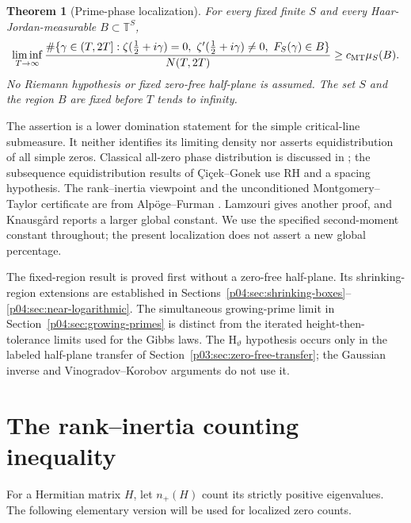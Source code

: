 \documentclass[11pt,letterpaper]{article}
\newtheorem{theorem}{Theorem}[section]
\theoremstyle{definition}
\theoremstyle{remark}
\newcommand{\T}{\mathbb T}
\newcommand{\1}{\mathbf 1}
\begin{document}
\begin{theorem}[Prime-phase localization]\label{p03:thm:main-phase}
For every fixed finite $S$ and every Haar-Jordan-measurable
$B\subset\T^S$,
\[
 \liminf_{T\to\infty}
 \frac{\#\{\gamma\in(T,2T]:\zeta(\tfrac12+i\gamma)=0,
 \ \zeta'(\tfrac12+i\gamma)\ne0,\ F_S(\gamma)\in B\}}
 {N(T,2T)}\ge c_{\rm MT}\mu_S(B).
\]
No Riemann hypothesis or fixed zero-free half-plane is assumed.
The set $S$ and the region $B$ are fixed before $T$ tends to infinity.
\end{theorem}

The assertion is a lower domination statement for the simple
critical-line submeasure. It neither identifies its limiting density
nor asserts equidistribution of all simple zeros. Classical
all-zero phase distribution is discussed in
\cite{AkbaryMurty,FordZaharescu,FordMengZaharescu}; the
subsequence equidistribution results of \c{C}i\c{c}ek--Gonek
\cite{CicekGonek} use RH and a spacing hypothesis.
The rank--inertia viewpoint and the unconditioned
Montgomery--Taylor certificate are from Alp\"oge--Furman
\cite{AlpogeFurman}. Lamzouri \cite{Lamzouri} gives another
proof, and Knausg\aa rd \cite{Knausgard} reports a larger global
constant. We use the specified second-moment constant throughout;
the present localization does not assert a new global percentage.

The fixed-region result is proved first without a zero-free
half-plane. Its shrinking-region extensions are established in
Sections~\ref{p04:sec:shrinking-boxes}--\ref{p04:sec:near-logarithmic}.
The simultaneous growing-prime limit in
Section~\ref{p04:sec:growing-primes} is distinct from the iterated
height-then-tolerance limits used for the Gibbs laws. The
$\mathrm H_\vartheta$ hypothesis occurs only in the labeled
half-plane transfer of Section~\ref{p03:sec:zero-free-transfer};
the Gaussian inverse and Vinogradov--Korobov arguments do not use it.



\section{The rank--inertia counting inequality}
\label{p03:sec:rank-basic}

For a Hermitian matrix $H$, let $n_+(H)$ count its strictly positive
eigenvalues. The following elementary version will be used for
localized zero counts.
\end{document}
